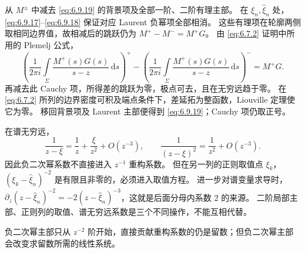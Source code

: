 \documentclass[lang=cn,scheme=chinese,mode=simple,device=normal,color=blue,
math=cm,thmcnt=section,12pt]{elegantbook}
\newcommand{\dd}{\,\mathrm{d}}
\begin{document}
\begin{callout}
    从 $M^\pm$ 中减去 \eqref{eq:6.9.19} 的背景项及全部一阶、二阶有理主部。
    在 $\xi_n,\widehat\xi_n$ 处，\eqref{eq:6.9.17}--\eqref{eq:6.9.18} 保证对应 Laurent 负幂项全部相消。
    这些有理项在轮廓两侧取相同边界值，故相减后的跳跃仍为
    $M^+-M^-=M^+G$。
    由 \eqref{eq:6.7.2} 证明中所用的 Plemelj 公式，
    \[
        \left(\dfrac{1}{2\pi i}\int\limits_\Sigma\dfrac{M^+(s)G(s)}{s-z}\dd s\right)^+
        -\left(\dfrac{1}{2\pi i}\int\limits_\Sigma\dfrac{M^+(s)G(s)}{s-z}\dd s\right)^-=M^+G.
    \]
    再减去此 Cauchy 项，所得差的跳跃为零，极点可去，且在无穷远趋于零。
    在 \eqref{eq:6.7.2} 所列的边界密度可积及端点条件下，差延拓为整函数，Liouville 定理使它为零。
    移回背景项及 Laurent 主部便得到 \eqref{eq:6.9.19}；Cauchy 项仍取正号。
\end{callout}


\begin{callout}[计算：二阶主部为何改变闭合而不直接改变重构阶数]
    在谱无穷远，
    \[
        \dfrac{1}{z-\xi}=\dfrac{1}{z}+\dfrac{\xi}{z^2}+O(z^{-3}),\qquad
        \dfrac{1}{(z-\xi)^2}=\dfrac{1}{z^2}+O(z^{-3}).
    \]
    因此负二次幂系数不直接进入 $z^{-1}$ 重构系数。
    但在另一列的正则取值点 $\xi_k$，$(\xi_k-\widehat\xi_n)^{-2}$ 是有限且非零的，必须进入取值方程。
    进一步对谱变量求导时，$\partial_z(z-\widehat\xi_n)^{-2}=-2(z-\widehat\xi_n)^{-3}$，这就是后面分母内系数 2 的来源。
    二阶局部主部、正则列的取值、谱无穷远系数是三个不同操作，不能互相代替。
\end{callout}


负二次幂主部只从 $z^{-2}$ 阶开始，直接贡献重构系数的仍是留数；但负二次幂主部会改变求留数所需的线性系统。
\end{document}
